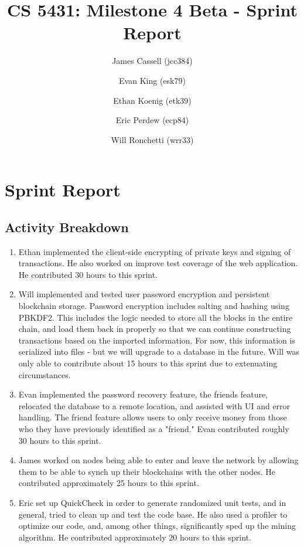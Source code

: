 \documentclass[a4paper,12pt]{article}
\title{CS 5431: Milestone 4 Beta - Sprint Report}
\author{
James Cassell (jcc384)
\and
Evan King (esk79)
\and
Ethan Koenig (etk39)
\and
Eric Perdew (ecp84)
\and
Will Ronchetti (wrr33)
}
\begin{document}
\maketitle

\section{Sprint Report}

\subsection{Activity Breakdown}

\begin{enumerate}
\item Ethan implemented the client-side encrypting of private keys and signing of transactions. He also worked on improve test coverage of the web application. He contributed 30 hours to this sprint.
\item Will implemented and tested user password encryption and persistent blockchain storage. Password encryption includes salting and hashing using PBKDF2. This includes the logic needed to store all the blocks in the entire chain, and load them back in properly so that we can continue constructing transactions based on the imported information. For now, this information is serialized into files - but we will upgrade to a database in the future. Will was only able to contribute about 15 hours to this sprint due to extenuating circumstances.
\item Evan implemented the password recovery feature, the friends feature, relocated the database to a remote location, and assisted with UI and error handling. The friend feature allows users to only receive money from those who they have previously identified as a "friend." Evan contributed roughly 30 hours to this sprint.
\item James worked on nodes being able to enter and leave the network by allowing them to be able to synch up their blockchains with the other nodes.
He contributed approximately 25 hours to this sprint.
\item  Eric set up QuickCheck in order to generate randomized unit tests, and in general, tried to clean up and test the code base. He also used a profiler to optimize our code, and, among other things, significantly sped up the mining algorithm. He contributed approximately 20 hours to this sprint.
\end{enumerate}
\end{document}
